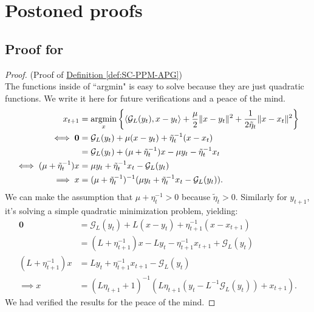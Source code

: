 \documentclass[12pt]{article}
\begin{document}




\appendix
\section{Postoned proofs}
    \subsection{Proof for \SCPPMAPG}\label{proof:derivations-SC-PPM-AGP}
        \begin{proof}
            (Proof of 
            \hyperref[def:SC-PPM-APG]
            {Definition \ref*{def:SC-PPM-APG}})
            \\
            The functions inside of ``argmin" is easy to solve because they are just quadratic functions. 
            We write it here for future verifications and a peace of the mind. 
            \begin{align*}
                x_{t + 1} &= \mathop{\rm argmin}\limits_{x}\left\lbrace
                    \langle \mathcal G_L(y_t), x - y_t\rangle 
                    + 
                    \frac{\mu}{2}\Vert x - y_t\Vert^2 +  
                    \frac{1}{2\tilde \eta_{t}}\Vert x - x_t\Vert^2
                \right\rbrace
                \\
                \iff 
                \mathbf 0 & = 
                \mathcal G_L(y_t) + \mu(x - y_t) + \tilde \eta_{t}^{-1}(x - x_t)
                \\
                &= 
                \mathcal G_L(y_t) + (\mu + \tilde \eta_{t}^{-1}) x - \mu y_t - \tilde \eta_{t}^{-1} x_t
                \\
                \iff 
                (\mu + \tilde \eta_{t}^{-1})x 
                &= 
                \mu y_t + \tilde \eta_{t}^{-1} x_t - \mathcal G_L(y_t)
                \\
                \implies 
                x &= (\mu + \tilde \eta_{t}^{-1})^{-1 }
                (\mu y_t + \tilde \eta_{t}^{-1} x_t - \mathcal G_L(y_t)). 
            \end{align*}
            We can make the assumption that $\mu + \eta_{t}^{-1} > 0$ because $\tilde\eta_t > 0$. 
            Similarly for $y_{t + 1}$, it's solving a simple quadratic minimization problem, yielding: 
            \begin{align*}
                \mathbf 0 &= \mathcal G_L(y_t) + L(x - y_t) + \eta_{t + 1}^{-1}(x - x_{t + 1})
                \\
                &= (L + \eta_{t + 1}^{-1})x - L y_t - \eta_{t + 1}^{-1}x_{t + 1} + \mathcal G_L(y_t) 
                \\
                (L + \eta_{t + 1}^{-1})x &= 
                Ly_t + \eta_{t + 1}^{-1} x_{t + 1} - \mathcal G_L(y_t)
                \\
                \implies 
                x &= 
                (L\eta_{t + 1} + 1)^{-1}(L\eta_{t + 1}(y_t - L^{-1}\mathcal G_L(y_t)) + x_{t + 1}). 
            \end{align*}
            We had verified the results for the peace of the mind. 
        \end{proof}
\end{document}
